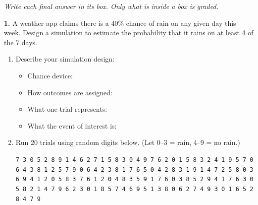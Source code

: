 \documentclass[10pt]{article}
\begin{document}
{\small\itshape Write each final answer in its box. Only what is inside a box is graded.}\par

\vspace{0.1in}

\begin{practicebox}
\small

\textbf{1.} A weather app claims there is a 40\% chance of rain on any given
day this week. Design a simulation to estimate the probability that it rains
on at least 4 of the 7 days.

\begin{enumerate}[label=(\alph*), leftmargin=2em, itemsep=8pt]
  \item Describe your simulation design:
        \begin{itemize}[itemsep=8pt]
          \item Chance device: \hfill\gradedright{\raisebox{-6pt}{\gradedblank[id=hw1a1, type=short, points=1, answer={random digits 0-9}, check=text, display={Digits 0--9}]{3.6in}{0.3in}}}\rule[-9pt]{0pt}{22pt}
          \item How outcomes are assigned: \hfill\gradedright{\raisebox{-6pt}{\gradedblank[id=hw1a2, type=short, points=1, answer={0-3 rain, 4-9 no rain}, check=text, display={0--3 rain, 4--9 not}]{3.6in}{0.3in}}}\rule[-9pt]{0pt}{22pt}
          \item What one trial represents: \hfill\gradedright{\raisebox{-6pt}{\gradedblank[id=hw1a3, type=short, points=1, answer={7 digits = 1 week}, check=text, display={7 digits = 1 week}]{3.6in}{0.3in}}}\rule[-9pt]{0pt}{22pt}
          \item What the event of interest is: \hfill\gradedright{\raisebox{-6pt}{\gradedblank[id=hw1a4, type=short, points=1, answer={4 or more of the 7 digits are 0-3}, check=text, display={$\ge 4$ of 7 in 0--3}]{3.6in}{0.3in}}}\rule[-9pt]{0pt}{22pt}
        \end{itemize}
  \item Run 20 trials using random digits below.  (Let 0--3 = rain, 4--9 = no rain.)

        {\small\texttt{7 3 0 5 2 8 9 1 4 6 2 7 1 5 8 3 0 4 9 7 6 2 0 1 5 8 3 2 4 1
        9 5 7 0 6 4 3 8 1 2 5 7 9 0 6 4 2 3 8 1 7 6 5 0 4 2 8 3 1 9
        1 4 7 2 5 8 0 3 6 9 4 1 2 0 5 8 3 7 6 1 2 0 4 8 3 5 9 1 7 6
        0 3 8 5 2 9 4 1 7 6 3 0 5 8 2 1 4 7 9 6 2 3 0 1 8 5 7 4 6 9
        5 1 3 8 0 6 2 7 4 9 3 0 1 6 5 2 8 4 7 9}}


\end{enumerate}
\end{practicebox}
\end{document}
